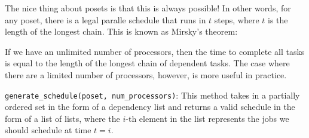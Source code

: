 \documentclass{article}
\begin{document}
    The nice thing about posets is that this is always possible! In other words, for any poset, there is a legal paralle schedule that runs in $t$ steps, where $t$ is the length of the longest chain. This is known as Mirsky's theorem:


    


    
    If we have an unlimited number of processors, then the time to complete all tasks is equal to the length of the longest chain of dependent tasks. The case where there are a limited number of processors, however, is more useful in practice.



    \begin{tcolorbox}[colback=yellow!40]
        \lstinline{generate_schedule(poset, num_processors)}:  This method takes in a partially ordered set in the form of a dependency list and returns a valid schedule in the form of a list of lists, where the $i$-th element in the list represents the jobs we should schedule at time $t = i$.
    \end{tcolorbox}






    
        

    
\end{document}
